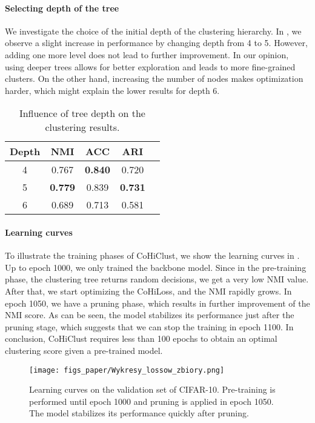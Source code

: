 \documentclass[runningheads]{llncs}
\def\our{CoHiClust}
\begin{document}
\paragraph{Selecting depth of the tree}

We investigate the choice of the initial depth of the clustering hierarchy. In , we observe a slight increase in performance by changing depth from 4 to 5. However, adding one more level does not lead to further improvement. In our opinion, using deeper trees allows for better exploration and leads to more fine-grained clusters. On the other hand, increasing the number of nodes makes optimization harder, which might explain the lower results for depth 6.


\begin{table}[!ht]
\centering
\caption{Influence of tree depth on the clustering results.} \label{tab:simclr}
\begin{tabular}{ccccc}
\toprule
 Depth & NMI & ACC & ARI\\
\midrule
4 & 0.767 & {\bf 0.840} & 0.720 &\\
5 & {\bf 0.779} & 0.839 & {\bf 0.731}\\
6 & 0.689 & 0.713 & 0.581 \\
\bottomrule
\end{tabular}
\end{table}

\paragraph{Learning curves}

To illustrate the training phases of \our{}, we show the learning curves in . Up to epoch 1000, we only trained the backbone model. Since in the pre-training phase, the clustering tree returns random decisions, we get a very low NMI value. After that, we start optimizing the CoHiLoss, and the NMI rapidly grows. In epoch 1050, we have a pruning phase, which results in further improvement of the NMI score. As can be seen, the model stabilizes its performance just after the pruning stage, which suggests that we can stop the training in epoch 1100. In conclusion, \our{} requires less than 100 epochs to obtain an optimal clustering score given a pre-trained model.

\begin{figure}[!htb]
    \centering
    \texttt{[image: figs\_paper/Wykresy\_lossow\_zbiory.png]}
    \caption{Learning curves on the validation set of CIFAR-10. Pre-training is performed until epoch 1000 and pruning is applied in epoch 1050. The model stabilizes its performance quickly after pruning.}
    \label{fig:wykresy}
\end{figure}
\end{document}
